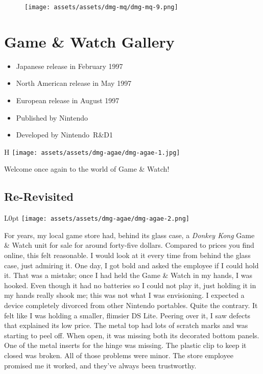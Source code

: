 \documentclass{book}
\begin{document}
\begin{figure}[hbt]
\vskip 10pt
\centering \texttt{[image: assets/assets/dmg-mq/dmg-mq-9.png]}
\vskip 6pt
\end{figure}


\begingroup \chapter*{Game \& Watch Gallery} \endgroup

\begin{itemize} \setlength\itemsep{-0.4em}
\item Japanese release in February 1997
\item North American release in May 1997
\item European release in August 1997
\item Published by Nintendo
\item Developed by Nintendo R\&D1
\end{itemize}\noindent

\begin{wrapfigure}{H}{\linewidth}
\vskip 4pt
\centering \texttt{[image: assets/assets/dmg-agae/dmg-agae-1.jpg]}\par\pagetwodescription Welcome once again to the world of Game \& Watch!\end{wrapfigure}
\clearpage

\FloatBarrier\needspace{5pt}\section*{Re-Revisited}\nopagebreak[4]

\begin{wrapfigure}{L}{0pt} \texttt{[image: assets/assets/dmg-agae/dmg-agae-2.png]}\end{wrapfigure}
For years, my local game store had, behind its glass case, a \emph{Donkey Kong} Game \& Watch unit for sale for around forty-five dollars. Compared to prices you find online, this felt reasonable. I would look at it every time from behind the glass case, just admiring it. One day, I got bold and asked the employee if I could hold it. That was a mistake; once I had held the Game \& Watch in my hands, I was hooked. Even though it had no batteries so I could not play it, just holding it in my hands really shook me; this was not what I was envisioning. I expected a device completely divorced from other Nintendo portables. Quite the contrary. It felt like I was holding a smaller, flimsier DS Lite. Peering over it, I saw defects that explained its low price. The metal top had lots of scratch marks and was starting to peel off. When open, it was missing both its decorated bottom panels. One of the metal inserts for the hinge was missing. The plastic clip to keep it closed was broken. All of those problems were minor. The store employee promised me it worked, and they’ve always been trustworthy.
\end{document}
